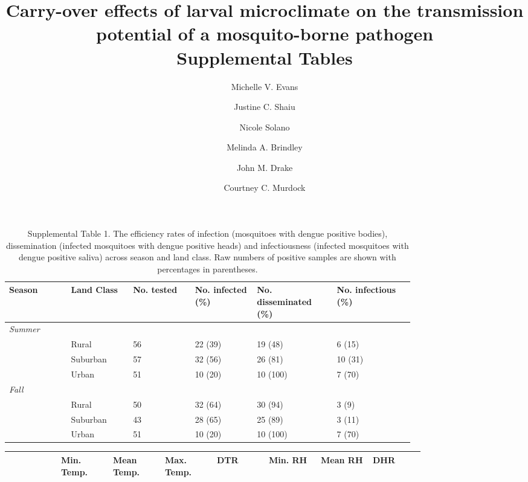 \documentclass[12pt]{article}
\begin{document}
\title{Carry-over effects of larval microclimate on the transmission potential of a mosquito-borne pathogen\\
\large Supplemental Tables}
\author{
		Michelle V. Evans\\
		\and
		Justine C. Shaiu\\
		\and
		Nicole Solano\\
		\and
		Melinda A. Brindley\\
		\and
		John M. Drake\\
    \and
    Courtney C. Murdock
		}
\date{}
\maketitle

\newpage

\begin{landscape}

\begin{table}[h]
\centering
\begin{tabular}{P{0.12\linewidth}P{0.12\linewidth}P{0.12\linewidth}P{0.12\linewidth}P{0.15\linewidth}P{0.15\linewidth}}
\hline
\textbf{Season} & \textbf{Land Class} & \textbf{No. tested} & \textbf{No. infected (\%)}  & \textbf{No. disseminated (\%)} & \textbf{No. infectious (\%)} \\
\hline
\hline
\textit{Summer} &   &   &   &   \\
     & Rural & 56 & 22 (39) & 19 (48) & 6 (15) \\
   & Suburban & 57 & 32 (56) & 26 (81) & 10 (31) \\
   & Urban & 51 & 10 (20) & 10 (100) & 7 (70) \\

\textit{Fall} &   &   &   &   \\
     & Rural & 50 & 32 (64) & 30 (94) & 3 (9) \\
   & Suburban & 43 & 28 (65) & 25 (89) & 3 (11) \\
   & Urban & 51 & 10 (20) & 10 (100) & 7 (70) \\
\hline
\end{tabular}
\caption{Supplemental Table 1. The efficiency rates of infection (mosquitoes with dengue positive bodies), dissemination (infected mosquitoes with dengue positive heads) and infectiousness (infected mosquitoes with dengue positive saliva) across season and land class. Raw numbers of positive samples are shown with percentages in parentheses.}
\end{table}

\begin{table}
\centering
\begin{tabular}{P{0.10\linewidth}P{0.10\linewidth}P{0.10\linewidth}P{0.10\linewidth}P{0.10\linewidth}P{0.10\linewidth}P{0.10\linewidth}P{0.10\linewidth}}
\hline
\textbf{ } & \textbf{Min. Temp.} & \textbf{Mean Temp.} & \textbf{Max. Temp.}  & \textbf{DTR} & \textbf{Min. RH} & \textbf{Mean RH} & \textbf{DHR} \\
\hline


\end{tabular}
\end{table}
\end{landscape}
\end{document}

